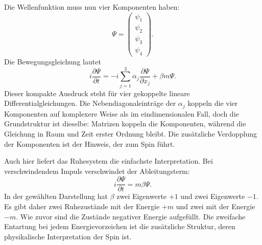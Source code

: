 Die Wellenfunktion muss nun vier Komponenten haben:
\begin{equation}
\Psi=
\begin{pmatrix}
\psi_1\\
\psi_2\\
\psi_3\\
\psi_4
\end{pmatrix}.
\end{equation}
Die Bewegungsgleichung lautet
\begin{equation}
i\frac{\partial\Psi}{\partial t}
=
-i\sum_{j=1}^{3}\alpha_j
\frac{\partial\Psi}{\partial x_j}
+\beta m\Psi.
\end{equation}
Dieser kompakte Ausdruck steht für vier gekoppelte lineare Differentialgleichungen. Die Nebendiagonaleinträge der \(\alpha_j\) koppeln die vier Komponenten auf komplexere Weise als im eindimensionalen Fall, doch die Grundstruktur ist dieselbe: Matrizen koppeln die Komponenten, während die Gleichung in Raum und Zeit erster Ordnung bleibt. Die zusätzliche Verdopplung der Komponenten ist der Hinweis, der zum Spin führt.

\begin{classroomqa}
\end{classroomqa}

Auch hier liefert das Ruhesystem die einfachste Interpretation. Bei verschwindendem Impuls verschwindet der Ableitungsterm:
\begin{equation}
i\frac{\partial\Psi}{\partial t}=m\beta\Psi.
\end{equation}
In der gewählten Darstellung hat \(\beta\) zwei Eigenwerte \(+1\) und zwei Eigenwerte \(-1\). Es gibt daher zwei Ruhezustände mit der Energie \(+m\) und zwei mit der Energie \(-m\). Wie zuvor sind die Zustände negativer Energie aufgefüllt. Die zweifache Entartung bei jedem Energievorzeichen ist die zusätzliche Struktur, deren physikalische Interpretation der Spin ist.

\begin{classroomqa}
\end{classroomqa}

